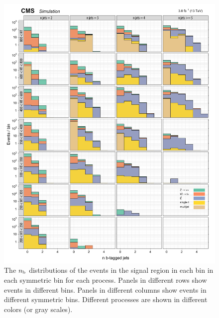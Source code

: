 \begin{figure}[!h]
\centering
\includegraphics[scale=0.95]{figures/kiplots/c150107_s150318_f015_nbjets_100}
\caption{The $n_{\text{b}}$ distributions of the events in the signal region in
each \scalht bin in each symmetric \njet bin for each process. Panels
in different rows show events in different \scalht bins. Panels in
different columns show events in different symmetric \njet bins.
Different processes are shown in different colors (or gray scales).}
\label{c150107_s150318_f015_nbjets_100}
\end{figure}

\clearpage

